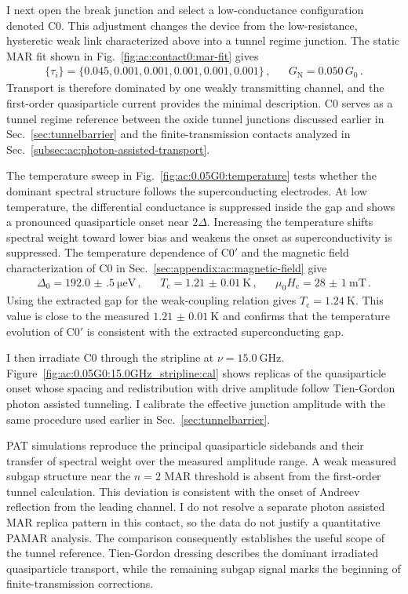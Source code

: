         I next open the break junction and select a low-conductance configuration denoted C0. This adjustment changes the device from the low-resistance, hysteretic weak link characterized above into a tunnel regime junction. The static MAR fit shown in Fig.~\ref{fig:ac:contact0:mar-fit} gives
        \begin{align}
            \{\tau_i\} = \{0.045, 0.001, 0.001, 0.001, 0.001, 0.001\}\,, &&
            G_\mathrm{N} = 0.050\,G_0\,.
            \label{eq:ac:contact0:pincode}
        \end{align}
        Transport is therefore dominated by one weakly transmitting channel, and the first-order quasiparticle current provides the minimal description. C0 serves as a tunnel regime reference between the oxide tunnel junctions discussed earlier in Sec.~\ref{sec:tunnelbarrier} and the finite-transmission contacts analyzed in Sec.~\ref{subsec:ac:photon-assisted-transport}.

        The temperature sweep in Fig.~\ref{fig:ac:0.05G0:temperature} tests whether the dominant spectral structure follows the superconducting electrodes. At low temperature, the differential conductance is suppressed inside the gap and shows a pronounced quasiparticle onset near $2\Delta$. Increasing the temperature shifts spectral weight toward lower bias and weakens the onset as superconductivity is suppressed. The temperature dependence of C0$'$ and the magnetic field characterization of C0 in Sec.~\ref{sec:appendix:ac:magnetic-field} give
        \begin{align}
            \Delta_0 = \qty{192.0(5)}{\micro\electronvolt}\,, &&
            T_\mathrm{c} = \qty{1.21(1)}{\kelvin}\,, &&
            \mu_0H_\mathrm{c} = \qty{28(1)}{\milli\tesla}\,.
        \end{align}
        Using the extracted gap for the weak-coupling relation gives $T_\mathrm{c}=\qty{1.24}{\kelvin}$. This value is close to the measured $\qty{1.21(1)}{\kelvin}$ and confirms that the temperature evolution of C0$'$ is consistent with the extracted superconducting gap.

        I then irradiate C0 through the stripline at $\nu=\qty{15.0}{\giga\hertz}$. Figure~\ref{fig:ac:0.05G0:15.0GHz_stripline:cal} shows replicas of the quasiparticle onset whose spacing and redistribution with drive amplitude follow Tien-Gordon photon assisted tunneling. I calibrate the effective junction amplitude with the same procedure used earlier in Sec.~\ref{sec:tunnelbarrier}.

        PAT simulations reproduce the principal quasiparticle sidebands and their transfer of spectral weight over the measured amplitude range. A weak measured subgap structure near the $n=2$ MAR threshold is absent from the first-order tunnel calculation. This deviation is consistent with the onset of Andreev reflection from the leading channel. I do not resolve a separate photon assisted MAR replica pattern in this contact, so the data do not justify a quantitative PAMAR analysis. The comparison consequently establishes the useful scope of the tunnel reference. Tien-Gordon dressing describes the dominant irradiated quasiparticle transport, while the remaining subgap signal marks the beginning of finite-transmission corrections.

